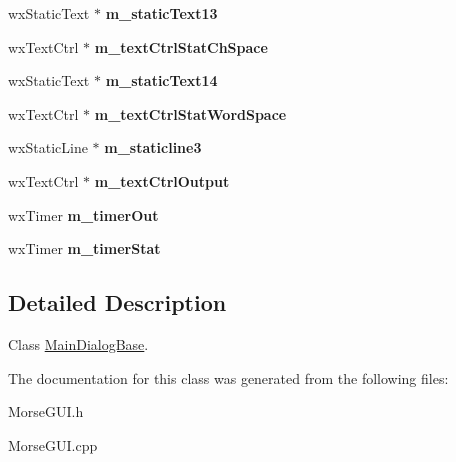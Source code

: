 \begin{DoxyCompactItemize}
wx\+Static\+Text $\ast$ {\bfseries m\+\_\+static\+Text13}
\item 
\mbox{\label{classMainDialogBase_a6cfe514859b1a8a45b7945550e7b3ee6}} 
wx\+Text\+Ctrl $\ast$ {\bfseries m\+\_\+text\+Ctrl\+Stat\+Ch\+Space}
\item 
\mbox{\label{classMainDialogBase_a91d797f7493de12b1072572c8cd01197}} 
wx\+Static\+Text $\ast$ {\bfseries m\+\_\+static\+Text14}
\item 
\mbox{\label{classMainDialogBase_ad89261c13d806f0de50c40359dcaf292}} 
wx\+Text\+Ctrl $\ast$ {\bfseries m\+\_\+text\+Ctrl\+Stat\+Word\+Space}
\item 
\mbox{\label{classMainDialogBase_a638f225b3c0e165f2b40b9fe9ddfee95}} 
wx\+Static\+Line $\ast$ {\bfseries m\+\_\+staticline3}
\item 
\mbox{\label{classMainDialogBase_ac44c9a46fc50a9ad4cd37dbc2235b69e}} 
wx\+Text\+Ctrl $\ast$ {\bfseries m\+\_\+text\+Ctrl\+Output}
\item 
\mbox{\label{classMainDialogBase_a9cbe518b2cd7c32fd11e91937cc09062}} 
wx\+Timer {\bfseries m\+\_\+timer\+Out}
\item 
\mbox{\label{classMainDialogBase_a8f6aa440def039635fed532a8674dbde}} 
wx\+Timer {\bfseries m\+\_\+timer\+Stat}
\end{DoxyCompactItemize}


\subsection{Detailed Description}
Class \hyperlink{classMainDialogBase}{Main\+Dialog\+Base}. 

The documentation for this class was generated from the following files\+:\begin{DoxyCompactItemize}
\item 
Morse\+G\+U\+I.\+h\item 
Morse\+G\+U\+I.\+cpp\end{DoxyCompactItemize}
